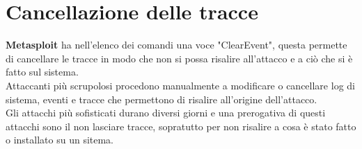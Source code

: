 \documentclass[a4paper,12pt]{article}
\begin{document}
\section{  Cancellazione delle tracce}

\textbf{Metasploit}\cite{metasploit} ha nell'elenco dei comandi una voce "ClearEvent", questa permette di cancellare le tracce in modo che non si possa risalire all'attacco e a ciò che si è fatto sul sistema.\\
Attaccanti più scrupolosi procedono manualmente  a modificare o cancellare log di sistema, eventi e tracce che permettono di risalire all'origine dell'attacco.\\
Gli attacchi più sofisticati durano diversi giorni e una prerogativa di questi attacchi sono il non lasciare tracce, sopratutto per non risalire a cosa è stato fatto o installato su un sitema.
\end{document}

